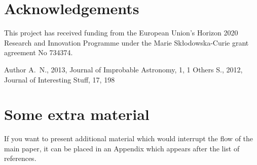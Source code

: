 \documentclass[a4paper,fleqn,usenatbib]{mnras}
\begin{document}
\section*{Acknowledgements}
This project has received funding from the European Union’s Horizon
2020 Research and Innovation Programme under the Marie
Sk\l{}odowska-Curie grant agreement No 734374. 







\begin{thebibliography}{99}
Author A.~N., 2013, Journal of Improbable Astronomy, 1, 1
Others S., 2012, Journal of Interesting Stuff, 17, 198
\end{thebibliography}



\appendix

\section{Some extra material}

If you want to present additional material which would interrupt the flow of the main paper,
it can be placed in an Appendix which appears after the list of references.



\bsp	%
\label{lastpage}

 
 
\end{document}
